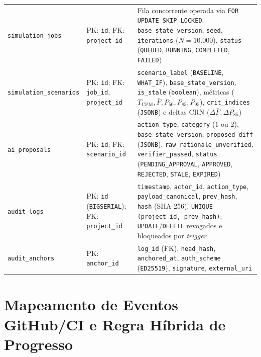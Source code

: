 \documentclass[12pt,openany,oneside,a4paper,english,brazilian,sumario=tradicional]{abntex2}
\newcommand{\fonteautores}{\par\vspace{1mm}{\small Fonte: Elaborado pelos autores (2026).}}
\begin{document}
\begin{table}[htbp]
{\begin{tabularx}{\textwidth}{L{3.35cm} L{2.75cm} Y}
\texttt{simulation\_\allowbreak jobs} & PK: \texttt{id}; FK: \texttt{project\_\allowbreak id} & Fila concorrente operada via \texttt{FOR UPDATE SKIP LOCKED}: \texttt{base\_\allowbreak state\_\allowbreak version}, \texttt{seed}, \texttt{iterations} ($N=10.000$), \texttt{status} (\texttt{QUEUED}, \texttt{RUNNING}, \texttt{COMPLETED}, \texttt{FAILED})\\
\texttt{simulation\_\allowbreak scenarios} & PK: \texttt{id}; FK: \texttt{job\_\allowbreak id}, \texttt{project\_\allowbreak id} & \texttt{scenario\_\allowbreak label} (\texttt{BASELINE}, \texttt{WHAT\_\allowbreak IF}), \texttt{base\_\allowbreak state\_\allowbreak version}, \texttt{is\_\allowbreak stale} (\texttt{boolean}), métricas ($T_{\mathrm{CPM}}, \bar{F}, P_{50}, P_{85}, P_{95}$), \texttt{crit\_\allowbreak indices} (\texttt{JSONB}) e deltas CRN ($\Delta\bar{F}, \Delta P_{85}$)\\
\texttt{ai\_\allowbreak proposals} & PK: \texttt{id}; FK: \texttt{scenario\_\allowbreak id} & \texttt{action\_\allowbreak type}, \texttt{category} ($1$ ou $2$), \texttt{base\_\allowbreak state\_\allowbreak version}, \texttt{proposed\_\allowbreak diff} (\texttt{JSONB}), \texttt{raw\_\allowbreak rationale\_\allowbreak unverified}, \texttt{verifier\_\allowbreak passed}, \texttt{status} (\texttt{PENDING\_\allowbreak APPROVAL}, \texttt{APPROVED}, \texttt{REJECTED}, \texttt{STALE}, \texttt{EXPIRED})\\
\texttt{audit\_\allowbreak logs} & PK: \texttt{id} (\texttt{BIGSERIAL}); FK: \texttt{project\_\allowbreak id} & \texttt{timestamp}, \texttt{actor\_\allowbreak id}, \texttt{action\_\allowbreak type}, \texttt{payload\_\allowbreak canonical}, \texttt{prev\_\allowbreak hash}, \texttt{hash} (SHA-256), \texttt{UNIQUE (project\_\allowbreak id, prev\_\allowbreak hash)}; \texttt{UPDATE}/\texttt{DELETE} revogados e bloqueados por \textit{trigger}\\
\texttt{audit\_\allowbreak anchors} & PK: \texttt{anchor\_\allowbreak id} & \texttt{log\_\allowbreak id} (FK), \texttt{head\_\allowbreak hash}, \texttt{anchored\_\allowbreak at}, \texttt{auth\_\allowbreak scheme} (\texttt{ED25519}), \texttt{signature}, \texttt{external\_\allowbreak uri}\\
\bottomrule
\end{tabularx}}
\fonteautores
\end{table}

\section{Mapeamento de Eventos GitHub/CI e Regra Híbrida de Progresso}\label{sec:eventos_git}
\end{document}
